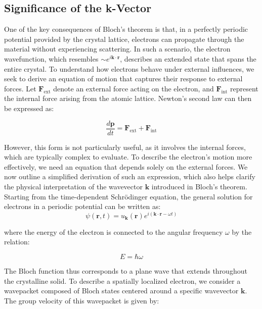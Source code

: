 \subsection{Significance of the k-Vector}
One of the key consequences of Bloch's theorem is that, in a perfectly periodic potential provided by the crystal lattice, electrons can propagate through the material without experiencing scattering. In such a scenario, the electron wavefunction, which resembles \( \sim e^{i\mathbf{k} \cdot \mathbf{r}} \), describes an extended state that spans the entire crystal.
To understand how electrons behave under external influences, we seek to derive an equation of motion that captures their response to external forces. Let \( \mathbf{F}_{\text{ext}} \) denote an external force acting on the electron, and \( \mathbf{F}_{\text{int}} \) represent the internal force arising from the atomic lattice. Newton’s second law can then be expressed as:

\begin{equation*}
	\frac{d\mathbf{p}}{dt} = \mathbf{F}_{\text{ext}} + \mathbf{F}_{\text{int}}
\end{equation*}

\noindent However, this form is not particularly useful, as it involves the internal forces, which are typically complex to evaluate. To describe the electron's motion more effectively, we need an equation that depends solely on the external forces. We now outline a simplified derivation of such an expression, which also helps clarify the physical interpretation of the wavevector \( \mathbf{k} \) introduced in Bloch’s theorem.
Starting from the time-dependent Schrödinger equation, the general solution for electrons in a periodic potential can be written as:
\begin{equation*}
	\psi(\mathbf{r}, t) = u_{\mathbf{k}}(\mathbf{r}) e^{i(\mathbf{k} \cdot \mathbf{r} - \omega t)}
\end{equation*}

\noindent where the energy of the electron is connected to the angular frequency \( \omega \) by the relation:

\begin{equation*}
	E = \hbar \omega
\end{equation*}

\noindent The Bloch function thus corresponds to a plane wave that extends throughout the crystalline solid. To describe a spatially localized electron, we consider a wavepacket composed of Bloch states centered around a specific wavevector \( \mathbf{k} \). The group velocity of this wavepacket is given by:

